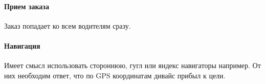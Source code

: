\documentclass[DIV=calc, paper=a4, fontsize=11pt]{scrartcl} %
\begin{document}
\paragraph{Прием заказа}
Заказ попадает ко всем водителям сразу. 



\paragraph{Навигация}
Имеет смысл использовать стороннюю, гугл или яндекс навигаторы например. От них необходим ответ, что по GPS координатам дивайс прибыл к цели.
\end{document}
